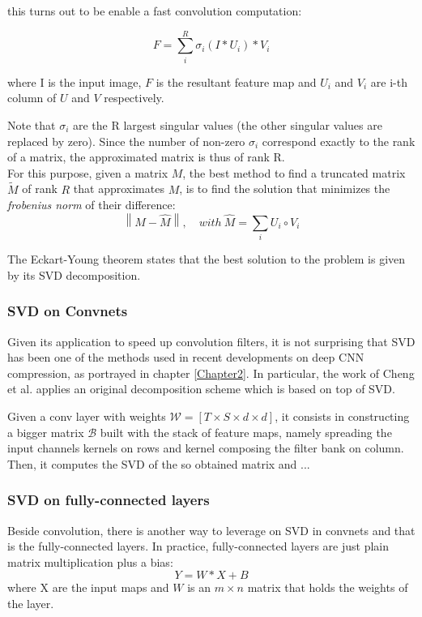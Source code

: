 this turns out to be enable a fast convolution computation: 

\begin{equation}
	F = \sum_{i}^{R} \sigma_i(I * U_i)*V_i  
\end{equation}

where I is the input image, $F$ is the resultant feature map and $U_i$ and $V_i$ are i-th column of $U$ and $V$ respectively. 

Note that $\sigma_i$ are the R largest singular values (the other singular values are replaced by zero). Since the number of non-zero $\sigma_i$ correspond exactly to the rank of a matrix, the approximated matrix is thus of rank R. \\
For this purpose, given a matrix $M$, the best method to find a truncated matrix $\tilde{M}$ of rank $R$ that approximates $M$, is to find the solution that minimizes the \emph{frobenius norm} of their difference:
\begin{equation}
\left \| M - \hat{M} \right \|, \quad with \ \hat{M} = \sum_i U_i \circ V_i
\end{equation}

The Eckart-Young theorem \parencite{Weckart} states that the best solution to the problem is given by its SVD decomposition. 

\subsubsection{SVD on Convnets}
Given its application to speed up convolution filters, it is not surprising that SVD has been one of the methods used in recent developments on deep CNN compression, as portrayed in chapter \ref{Chapter2}.
In particular, the work of Cheng et al. \parencite{zhang2015SVD} applies an original decomposition scheme which is based on top of SVD. 

Given a conv layer with weights $\mathcal{W} = [T \times S \times d \times d]$, it consists in constructing a bigger matrix $\mathcal{B}$ built with the stack of feature maps, namely spreading the input channels kernels on rows and kernel composing the filter bank on column. Then, it computes the SVD of the so obtained matrix and ... 
 

\subsubsection{SVD on fully-connected layers}
\label{subsec:svd-fc}
Beside convolution, there is another way to leverage on SVD in convnets and that is the fully-connected layers. In practice, fully-connected layers are just plain matrix multiplication plus a bias:
\begin{equation}
\label{eq:fc}
Y = W*X+B 
\end{equation}
where X are the input maps and $W$ is an $m \times n$ matrix that holds the weights of the layer.  

